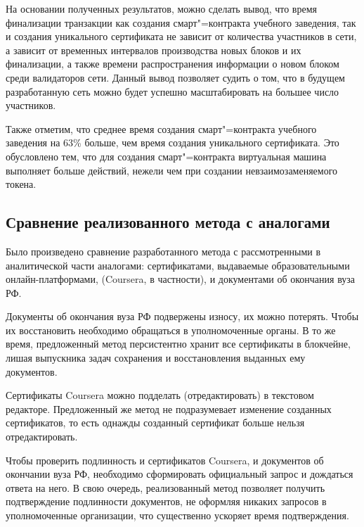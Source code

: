 На основании полученных результатов, можно сделать вывод, что время финализации транзакции как создания смарт"=контракта учебного заведения, так и создания уникального сертификата не зависит от количества участников в сети, а зависит от временных интервалов производства новых блоков и их финализации, а также времени распространения информации о новом блоком среди валидаторов сети. Данный вывод позволяет судить о том, что в будущем разработанную сеть можно будет успешно масштабировать на большее число участников.

Также отметим, что среднее время создания смарт"=контракта учебного заведения на 63\% больше, чем время создания уникального сертификата. Это обусловлено тем, что для создания смарт"=контракта виртуальная машина выполняет больше действий, нежели чем при создании невзаимозаменяемого токена.



\subsection{Сравнение реализованного метода с аналогами}

Было произведено сравнение разработанного метода с рассмотренными в аналитической части аналогами: сертификатами, выдаваемые образовательными онлайн-платформами, (Coursera, в частности), и документами об окончания вуза РФ.

Документы об окончания вуза РФ подвержены износу, их можно потерять. Чтобы их восстановить необходимо обращаться в уполномоченные органы. В то же время, предложенный метод персистентно хранит все сертификаты в блокчейне, лишая выпускника задач сохранения и восстановления выданных ему документов.

Сертификаты Coursera можно подделать (отредактировать) в текстовом редакторе. Предложенный же метод не подразумевает изменение созданных сертификатов, то есть однажды созданный сертификат больше нельзя отредактировать.

Чтобы проверить подлинность и сертификатов Coursera, и документов об окончании вуза РФ, необходимо сформировать официальный запрос и дождаться ответа на него. В свою очередь, реализованный метод позволяет получить подтверждение подлинности документов, не оформляя никаких запросов в уполномоченные организации, что существенно ускоряет время подтверждения.


